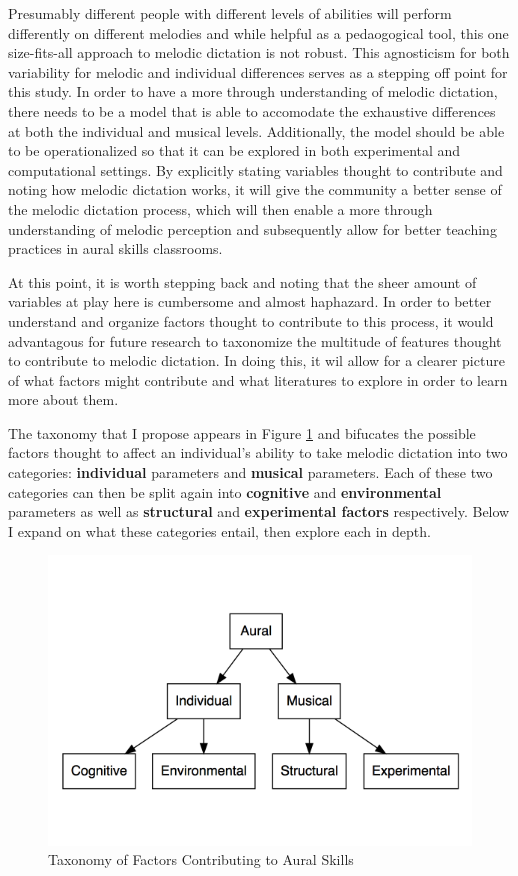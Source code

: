 \documentclass[]{book}
\begin{document}
Presumably different people with different levels of abilities will perform differently on different melodies and while helpful as a pedaogogical tool, this one size-fits-all approach to melodic dictation is not robust.
This agnosticism for both variability for melodic and individual differences serves as a stepping off point for this study.
In order to have a more through understanding of melodic dictation, there needs to be a model that is able to accomodate the exhaustive differences at both the individual and musical levels.
Additionally, the model should be able to be operationalized so that it can be explored in both experimental and computational settings.
By explicitly stating variables thought to contribute and noting how melodic dictation works, it will give the community a better sense of the melodic dictation process, which will then enable a more through understanding of melodic perception and subsequently allow for better teaching practices in aural skills classrooms.

At this point, it is worth stepping back and noting that the sheer amount of variables at play here is cumbersome and almost haphazard.
In order to better understand and organize factors thought to contribute to this process, it would advantagous for future research to taxonomize the multitude of features thought to contribute to melodic dictation.
In doing this, it wil allow for a clearer picture of what factors might contribute and what literatures to explore in order to learn more about them.

The taxonomy that I propose appears in Figure \ref{fig:taxonomy} and bifucates the possible factors thought to affect an individual's ability to take melodic dictation into two categories: \textbf{individual} parameters and \textbf{musical} parameters.
Each of these two categories can then be split again into \textbf{cognitive} and \textbf{environmental} parameters as well as \textbf{structural} and \textbf{experimental factors} respectively.
Below I expand on what these categories entail, then explore each in depth.

\begin{figure}

{\centering \includegraphics[width=0.8\linewidth]{img/taxonomy4} 

}

\caption{Taxonomy of Factors Contributing to Aural Skills}\label{fig:taxonomy}
\end{figure}
\end{document}
